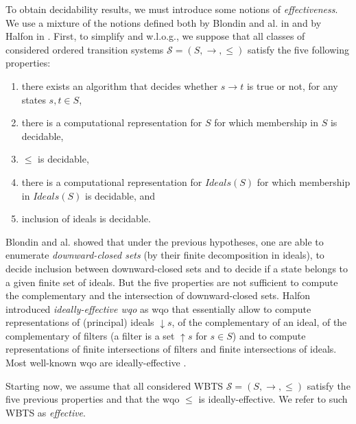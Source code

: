 \documentclass[runningheads]{llncs}
\begin{document}
To obtain decidability results, we must introduce some notions of \emph{effectiveness}. We use a mixture of the notions defined both by Blondin and al. in \cite{DBLP:journals/lmcs/BlondinFM17} and by Halfon in \cite{DBLP:phd/hal/Halfon18}.
First, to simplify and w.l.o.g., we suppose that all classes of considered ordered transition systems $\mathscr{S}=(S, \rightarrow, \leq)$ satisfy the five following properties:
\begin{enumerate}
\item there exists an algorithm that decides whether $s \rightarrow t$ is true or not, for any states $s,t \in S$,
%
\item there is a computational representation for $S$ for which membership in $S$ is decidable,
%
\item $\leq$ is decidable,
\item there is a computational representation for $Ideals(S)$ for which membership in $Ideals(S)$ is decidable, and
\item  inclusion of ideals is decidable. 
\end{enumerate}
%
Blondin and al. showed \cite[Lemma 4.3]{DBLP:journals/lmcs/BlondinFM17} that under the
previous hypotheses, one are able to enumerate \emph{downward-closed sets} (by their finite decomposition in ideals), to decide inclusion between downward-closed sets and to decide if a state belongs to a given finite set of ideals. But the five properties are not sufficient to compute the complementary and the intersection of downward-closed sets.
%
Halfon introduced \emph{ideally-effective wqo} as wqo that essentially allow to compute representations of (principal) ideals $\mathop{\downarrow} s$, of the complementary of an ideal, of the complementary of filters (a filter is a set $\mathop{\uparrow} s$ for $s \in S$) and to compute representations of finite intersections of filters and finite intersections of ideals. Most well-known wqo are ideally-effective \cite{DBLP:phd/hal/Halfon18}.

%
Starting now, we assume that all considered WBTS $\mathscr{S}=(S, \rightarrow, \leq)$ satisfy the five previous properties and that the wqo $\leq$ is ideally-effective. We refer to such WBTS as \emph{effective}.
\end{document}
